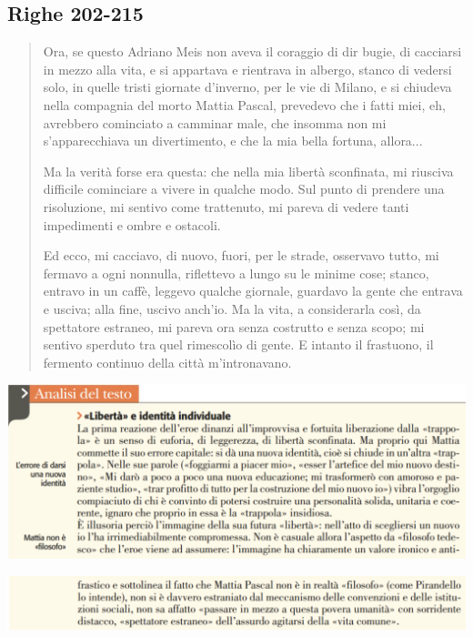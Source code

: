 \documentclass[a4paper, twoside, titlepage]{book}
\begin{document}
\subsection*{Righe 202-215}

\begin{quotation}
Ora, se questo Adriano Meis non aveva il coraggio di dir bugie, di cacciarsi in mezzo alla vita, e si appartava e rientrava in albergo, stanco di vedersi solo, in quelle tristi giornate d’inverno, per le vie di Milano, e si chiudeva nella compagnia del morto Mattia Pascal, prevedevo che i fatti miei, eh, avrebbero cominciato a camminar male, che insomma non mi s’apparecchiava un divertimento, e che la mia bella fortuna, allora...

Ma la verità forse era questa: che nella mia libertà sconfinata, mi riusciva difficile cominciare a vivere in qualche modo. Sul punto di prendere una risoluzione, mi sentivo come trattenuto, mi pareva di vedere tanti impedimenti e ombre e ostacoli.

Ed ecco, mi cacciavo, di nuovo, fuori, per le strade, osservavo tutto, mi fermavo a ogni nonnulla, riflettevo a lungo su le minime cose; stanco, entravo in un caffè, leggevo qualche giornale, guardavo la gente che entrava e usciva; alla fine, uscivo anch’io. Ma la vita, a considerarla così, da spettatore estraneo, mi pareva ora senza costrutto e senza scopo; mi sentivo sperduto tra quel rimescolìo di gente. E intanto il frastuono, il fermento continuo della città m’intronavano.
\end{quotation}

\begin{center}
\includegraphics[width=\textwidth]{identita1}
\end{center}
\vfill
\begin{center}
\includegraphics[width=\textwidth]{identita2}
\end{center}
\end{document}
